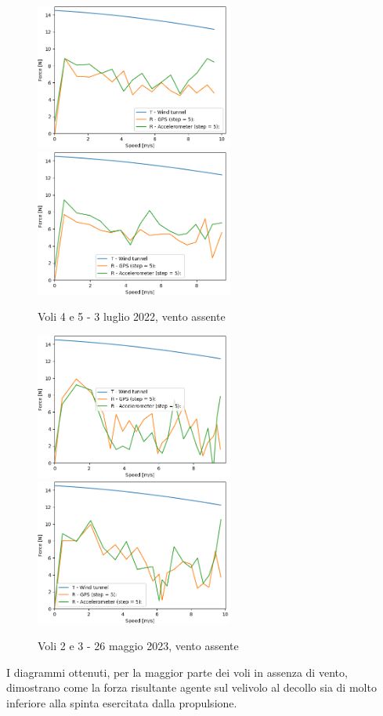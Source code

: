 \documentclass[12pt]{article}
\begin{document}
\begin{figure}[!h]
	\centering
	\includegraphics[width=6.5cm]{img/TvsR-6-4-c}
	\includegraphics[width=6.5cm]{img/TvsR-6-5-c}
	\captionsetup{labelformat=empty}
	\caption{Voli 4 e 5 - 3 luglio 2022, vento assente}
\end{figure}
\begin{figure}[!h]
	\centering
	\includegraphics[width=6.5cm]{img/TvsR-7-2-c}
	\includegraphics[width=6.5cm]{img/TvsR-7-3-c}
	\captionsetup{labelformat=empty}
	\caption{Voli 2 e 3 - 26 maggio 2023, vento assente}
\end{figure}

\noindent
I diagrammi ottenuti, per la maggior parte dei voli in assenza di vento, dimostrano come la forza risultante agente sul velivolo al decollo sia di molto inferiore alla spinta esercitata dalla propulsione.

\newpage


\end{document}
